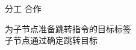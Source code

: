 
\begin{frame}{}
  \begin{center}
  \end{center}
\end{frame}

\begin{frame}
\end{frame}

\begin{frame}{}
  \begin{center}
    {\Large 分工 \qquad 合作}

    \vspace{0.30cm}
  \end{center}

  \pause
  \begin{center}
    为子节点准备跳转指令的目标标签 \\[5pt]
    子节点通过确定跳转目标
  \end{center}
\end{frame}

\begin{frame}{}
\end{frame}
